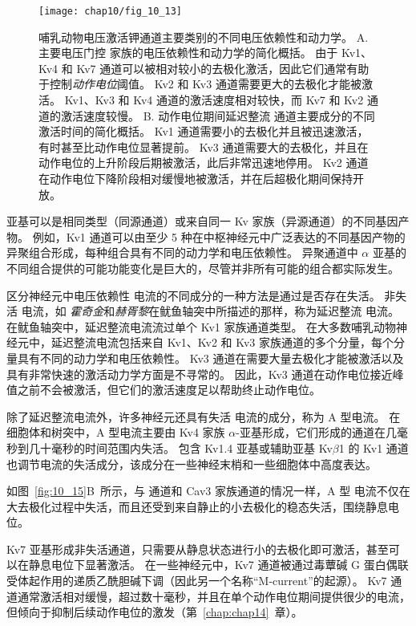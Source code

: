 \begin{figure}[htbp]
	\centering
	\texttt{[image: chap10/fig\_10\_13]}
	\caption{哺乳动物电压激活钾通道主要类别的不同电压依赖性和动力学。
		A. 主要电压门控  家族的电压依赖性和动力学的简化概括。
		由于 Kv1、Kv4 和 Kv7 通道可以被相对较小的去极化激活，因此它们通常有助于控制\textit{动作电位}阈值。
		Kv2 和 Kv3 通道需要更大的去极化才能被激活。
		Kv1、Kv3 和 Kv4 通道的激活速度相对较快，而 Kv7 和 Kv2 通道的激活速度较慢。
		B. 动作电位期间延迟整流  通道主要成分的不同激活时间的简化概括。
		Kv1 通道需要小的去极化并且被迅速激活，有时甚至比动作电位显著提前。
		Kv3 通道需要大的去极化，并且在动作电位的上升阶段后期被激活，此后非常迅速地停用。
		Kv2 通道在动作电位下降阶段相对缓慢地被激活，并在后超极化期间保持开放\cite{johnston2010symposium}。}
	\label{fig:10_13}
\end{figure}


亚基可以是相同类型（同源通道）或来自同一 Kv 家族（异源通道）的不同基因产物。
例如，Kv1 通道可以由至少 5 种在中枢神经元中广泛表达的不同基因产物的异聚组合形成，每种组合具有不同的动力学和电压依赖性。
异聚通道中 $\alpha$ 亚基的不同组合提供的可能功能变化是巨大的，尽管并非所有可能的组合都实际发生。


区分神经元中电压依赖性  电流的不同成分的一种方法是通过是否存在失活。
非失活  电流，如 \textit{霍奇金}和\textit{赫胥黎}在鱿鱼轴突中所描述的那样，称为延迟整流  电流。
在鱿鱼轴突中，延迟整流电流流过单个 Kv1 家族通道类型。
在大多数哺乳动物神经元中，延迟整流电流包括来自 Kv1、Kv2 和 Kv3 家族通道的多个分量，每个分量具有不同的动力学和电压依赖性。
Kv3 通道在需要大量去极化才能被激活以及具有非常快速的激活动力学方面是不寻常的。
因此，Kv3 通道在动作电位接近峰值之前不会被激活，但它们的激活速度足以帮助终止动作电位。


除了延迟整流电流外，许多神经元还具有失活  电流的成分，称为 A 型电流。
在细胞体和树突中，A 型电流主要由 Kv4 家族 $\alpha$-亚基形成，它们形成的通道在几毫秒到几十毫秒的时间范围内失活。
包含 Kv1.4 亚基或辅助亚基 Kv$\beta$1 的 Kv1 通道也调节电流的失活成分，该成分在一些神经末梢和一些细胞体中高度表达。


如图~\ref{fig:10_15}B~所示，与  通道和 Cav3 家族通道的情况一样，A 型  电流不仅在大去极化过程中失活，而且还受到来自静止的小去极化的稳态失活，围绕静息电位。


Kv7 亚基形成非失活通道，只需要从静息状态进行小的去极化即可激活，甚至可以在静息电位下显著激活。
在一些神经元中，Kv7 通道被通过毒蕈碱 G 蛋白偶联受体起作用的递质乙酰胆碱下调（因此另一个名称“M-current”的起源）。
Kv7 通道通常激活相对缓慢，超过数十毫秒，并且在单个动作电位期间提供很少的电流，但倾向于抑制后续动作电位的激发（第~\ref{chap:chap14}~章）。


